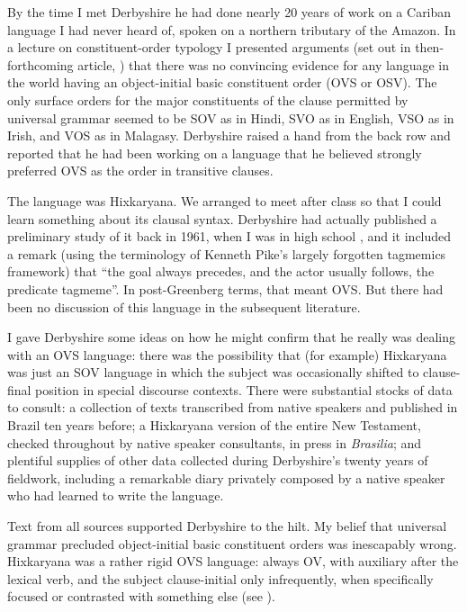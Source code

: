 \documentclass[output=paper,colorlinks,citecolor=brown
]{langscibook}
\begin{document}
By the time I met Derbyshire he had done nearly 20 years of work on
a Cariban language I had never heard of, spoken on a northern tributary
of the Amazon. In a lecture on constituent-order typology I presented
arguments (set out in then-forthcoming article, \citealt{Pullum77})
that there was no convincing evidence for any language in the world
having an object-initial basic constituent order (OVS or OSV). The
only surface orders for the major constituents of the clause permitted
by universal grammar seemed to be SOV as in Hindi, SVO as in English,
VSO as in Irish, and VOS as in Malagasy. Derbyshire raised a hand
from the back row and reported that he had been working on a language
that he believed strongly preferred OVS as the order in transitive
clauses.

The language was Hixkaryana. We arranged to meet after class so that
I could learn something about its clausal syntax. Derbyshire had actually
published a preliminary study of it back in 1961, when I was in high
school \citep{Derbyshire61}, and it included a remark (using the
terminology of Kenneth Pike's largely forgotten tagmemics framework)
that ``the goal always precedes, and the actor usually follows, the
predicate tagmeme''. In post-Greenberg terms, that meant OVS. But
there had been no discussion of this language in the subsequent
literature.

I gave Derbyshire some ideas on how he might confirm that he really
was dealing with an OVS language: there was the possibility that
(for example) Hixkaryana was just an SOV language in which the subject
was occasionally shifted to clause-final position in special discourse
contexts. There were substantial stocks of data to consult: a
collection of texts transcribed from native speakers and published
in Brazil ten years before; a Hixkaryana version of the entire New
Testament, checked throughout by native speaker consultants, in press
in \textit{Brasilia}; and plentiful supplies of other data collected during
Derbyshire's twenty years of fieldwork, including a remarkable diary
privately composed by a native speaker who had learned to write the
language.

Text from all sources supported Derbyshire to the hilt. My belief
that universal grammar precluded object-initial basic constituent
orders was inescapably wrong. Hixkaryana was a rather rigid OVS
language: always OV, with auxiliary after the lexical verb, and
the subject clause-initial only infrequently, when specifically
focused or contrasted with something else (see
\citealt[74]{Derbyshire85}).
\end{document}

